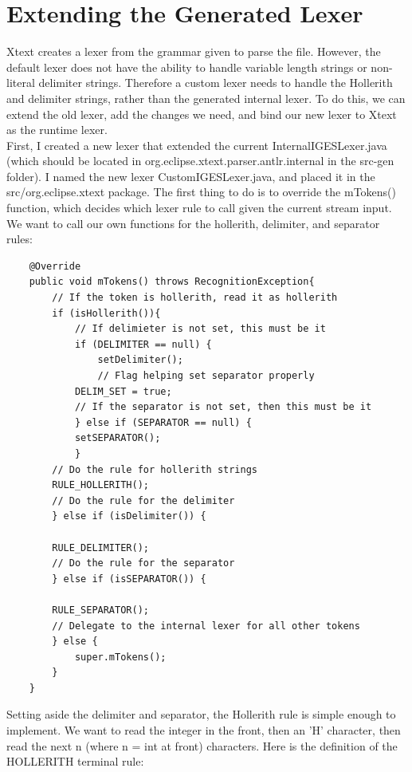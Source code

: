 \section{Extending the Generated Lexer}

Xtext creates a lexer from the grammar given to parse the file. However, the default lexer does not have the ability to handle variable length strings or non-literal delimiter strings. Therefore a custom lexer needs to handle the Hollerith and delimiter strings, rather than the generated internal lexer. To do this, we can extend the old lexer, add the changes we need, and bind our new lexer to Xtext as the runtime lexer.\\

First, I created a new lexer that extended the current InternalIGESLexer.java (which should be located in org.eclipse.xtext.parser.antlr.internal in the src-gen folder). I named the new lexer CustomIGESLexer.java, and placed it in the src/org.eclipse.xtext package. The first thing to do is to override the mTokens() function, which decides which lexer rule to call given the current stream input. We want to call our own functions for the hollerith, delimiter, and separator rules:

\begin{Verbatim}
    @Override 
    public void mTokens() throws RecognitionException{
        // If the token is hollerith, read it as hollerith
    	if (isHollerith()){
            // If delimieter is not set, this must be it
    	    if (DELIMITER == null) {
    	        setDelimiter();
                // Flag helping set separator properly
    		DELIM_SET = true;
            // If the separator is not set, then this must be it
    	    } else if (SEPARATOR == null) {
    		setSEPARATOR();
    	    }
        // Do the rule for hollerith strings
    	RULE_HOLLERITH();
        // Do the rule for the delimiter
    	} else if (isDelimiter()) {
    		
	    RULE_DELIMITER();
        // Do the rule for the separator
    	} else if (isSEPARATOR()) {
    		
	    RULE_SEPARATOR();
        // Delegate to the internal lexer for all other tokens
        } else {
    	    super.mTokens();
    	}
    }
\end{Verbatim}

Setting aside the delimiter and separator, the Hollerith rule is simple enough to implement. We want to read the integer in the front, then an 'H' character, then read the next n (where n = int at front) characters. Here is the definition of the HOLLERITH terminal rule:


